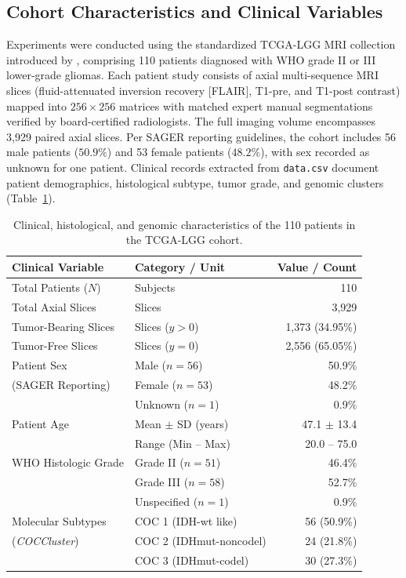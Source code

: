 \documentclass[preprint,12pt,authoryear]{elsarticle}
\begin{document}
\subsection{Cohort Characteristics and Clinical Variables}
Experiments were conducted using the standardized TCGA-LGG MRI collection introduced by \citet{buda2019association}, comprising 110 patients diagnosed with WHO grade II or III lower-grade gliomas. Each patient study consists of axial multi-sequence MRI slices (fluid-attenuated inversion recovery [FLAIR], T1-pre, and T1-post contrast) mapped into $256 \times 256$ matrices with matched expert manual segmentations verified by board-certified radiologists. The full imaging volume encompasses 3,929 paired axial slices. Per SAGER reporting guidelines, the cohort includes 56 male patients ($50.9\%$) and 53 female patients ($48.2\%$), with sex recorded as unknown for one patient. Clinical records extracted from \texttt{data.csv} document patient demographics, histological subtype, tumor grade, and genomic clusters (Table~\ref{tab:clinical_cohort}).

\begin{table}[tbp]
\centering
\caption{Clinical, histological, and genomic characteristics of the 110 patients in the TCGA-LGG cohort.}
\label{tab:clinical_cohort}
\setlength{\tabcolsep}{8pt}
\small
\begin{tabular*}{\textwidth}{@{\extracolsep{\fill}}llr}
\toprule
\textbf{Clinical Variable} & \textbf{Category / Unit} & \textbf{Value / Count} \\
\midrule
Total Patients ($N$) & Subjects & 110 \\
Total Axial Slices & Slices & 3,929 \\
Tumor-Bearing Slices & Slices ($y > 0$) & 1,373 (34.95\%) \\
Tumor-Free Slices & Slices ($y = 0$) & 2,556 (65.05\%) \\
\midrule
Patient Sex & Male ($n=56$) & 50.9\% \\
(SAGER Reporting) & Female ($n=53$) & 48.2\% \\
 & Unknown ($n=1$) & 0.9\% \\
Patient Age & Mean $\pm$ SD (years) & 47.1 $\pm$ 13.4 \\
& Range (Min -- Max) & 20.0 -- 75.0 \\
\midrule
WHO Histologic Grade & Grade II ($n=51$) & 46.4\% \\
& Grade III ($n=58$) & 52.7\% \\
& Unspecified ($n=1$) & 0.9\% \\
\midrule
Molecular Subtypes & COC 1 (IDH-wt like) & 56 (50.9\%) \\
(\textit{COCCluster}) & COC 2 (IDHmut-noncodel) & 24 (21.8\%) \\
& COC 3 (IDHmut-codel) & 30 (27.3\%) \\
\bottomrule
\end{tabular*}
\end{table}
\end{document}
